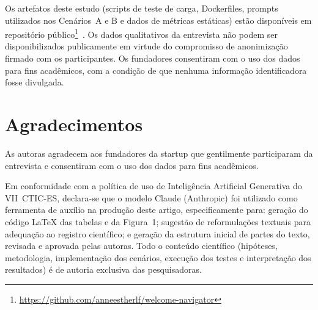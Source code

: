 \documentclass[sigconf]{acmart}
\begin{document}
Os artefatos deste estudo (scripts de teste de carga, Dockerfiles, prompts
utilizados nos Cenários~A e B e dados de métricas estáticas) estão disponíveis em
repositório público\footnote{\url{https://github.com/anneestherlf/welcome-navigator}}~\cite{WelcomeNavigator2025}. Os
dados qualitativos da entrevista não podem ser disponibilizados publicamente em virtude
do compromisso de anonimização firmado com os participantes. Os fundadores consentiram
com o uso dos dados para fins acadêmicos, com a condição de que nenhuma informação
identificadora fosse divulgada.

\section*{Agradecimentos}

As autoras agradecem aos fundadores da startup que gentilmente participaram da
entrevista e consentiram com o uso dos dados para fins acadêmicos.

Em conformidade com a política de uso de Inteligência Artificial Generativa do
VII~CTIC-ES, declara-se que o modelo Claude (Anthropic) foi utilizado como ferramenta
de auxílio na produção deste artigo, especificamente para: geração do código
\LaTeX{} das tabelas e da Figura~1; sugestão de reformulações textuais para adequação
ao registro científico; e geração da estrutura inicial de partes do texto, revisada e
aprovada pelas autoras. Todo o conteúdo científico (hipóteses, metodologia,
implementação dos cenários, execução dos testes e interpretação dos resultados)
é de autoria exclusiva das pesquisadoras.



\end{document}
